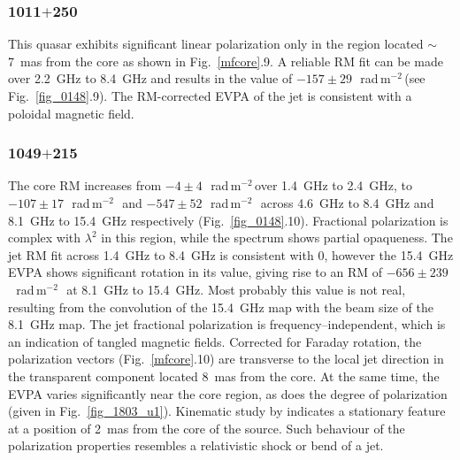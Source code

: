 \documentclass[a4paper,fleqn,usenatbib,useAMS]{mnras}
\newcommand{\rmu}{\,rad\,m$^{-2}$\,} %
\begin{document}
\subsubsection{1011$+$250}
This quasar exhibits significant linear polarization only in the region located $\sim$ 7~mas from the core as shown in Fig.~\ref{mfcore}.9. 
A reliable RM fit can be made over 2.2~GHz to 8.4~GHz and results in the value of $-157\pm29$~\rmu (see Fig.~\ref{fig_0148}.9). 
The RM-corrected EVPA of the jet is consistent with a poloidal magnetic field.

\subsubsection{1049$+$215}
The core RM increases from $-4\pm4$~\rmu over 1.4~GHz to 2.4~GHz, to $-107\pm17$~\rmu\ and $-547\pm52$~\rmu\ across 4.6~GHz to 8.4~GHz and 8.1~GHz to 15.4~GHz respectively (Fig.~\ref{fig_0148}.10). 
Fractional polarization is complex with $\lambda^2$ in this region, while the spectrum shows partial opaqueness.
The jet RM fit across 1.4~GHz to 8.4~GHz is consistent with 0, however the 15.4~GHz EVPA shows significant rotation in its value, giving rise to an RM of $-656\pm239$~\rmu\ at 8.1~GHz to 15.4~GHz. 
Most probably this value is not real, resulting from the convolution of the 15.4~GHz map with the beam size of the 8.1~GHz map.
The jet fractional polarization is frequency--independent, which is an indication of tangled magnetic fields.
Corrected for Faraday rotation, the polarization vectors (Fig.~\ref{mfcore}.10) are transverse to the local jet direction in the transparent component located 8~mas from the core. 
At the same time, the EVPA varies significantly near the core region, as does the degree of polarization (given in Fig.~\ref{fig_1803_u1}). 
Kinematic study by \citet{2016AJ....152...12L} indicates a stationary feature at a position of 2~mas from the core of the source.
Such behaviour of the polarization properties resembles a relativistic shock or bend of a jet.
\end{document}
